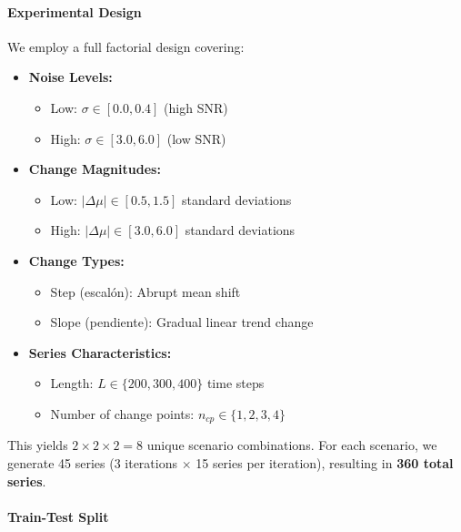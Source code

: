 \documentclass[journal,article,submit,pdftex,moreauthors]{Definitions/mdpi}
\begin{document}
\paragraph{Experimental Design}

We employ a full factorial design covering:

\begin{itemize}
    \item \textbf{Noise Levels:} 
    \begin{itemize}
        \item Low: $\sigma \in [0.0, 0.4]$ (high SNR)
        \item High: $\sigma \in [3.0, 6.0]$ (low SNR)
    \end{itemize}
    
    \item \textbf{Change Magnitudes:}
    \begin{itemize}
        \item Low: $|\Delta\mu| \in [0.5, 1.5]$ standard deviations
        \item High: $|\Delta\mu| \in [3.0, 6.0]$ standard deviations
    \end{itemize}
    
    \item \textbf{Change Types:}
    \begin{itemize}
        \item Step (escalón): Abrupt mean shift
        \item Slope (pendiente): Gradual linear trend change
    \end{itemize}
    
    \item \textbf{Series Characteristics:}
    \begin{itemize}
        \item Length: $L \in \{200, 300, 400\}$ time steps
        \item Number of change points: $n_{cp} \in \{1, 2, 3, 4\}$
    \end{itemize}
\end{itemize}

This yields $2 \times 2 \times 2 = 8$ unique scenario combinations. For each scenario, we generate 45 series (3 iterations $\times$ 15 series per iteration), resulting in \textbf{360 total series}.

\paragraph{Train-Test Split}
\end{document}
